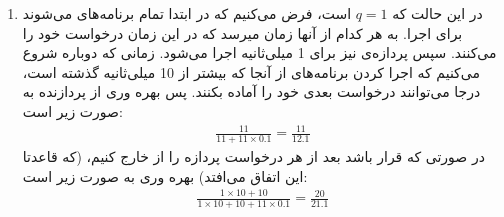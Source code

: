 \begin{enumerate}
    \item در این حالت که
    $q = 1$
    است، فرض می‌کنیم که در ابتدا تمام برنامه‌های
    می‌شوند برای اجرا. به هر کدام از آنها
    زمان میرسد که در این زمان درخواست
    خود را
    می‌کنند. سپس پردازه‌ی
    نیز برای 1 میلی‌ثانیه اجرا می‌شود. زمانی که دوباره شروع می‌کنیم که اجرا کردن برنامه‌های
    از آنجا که بیشتر از 10 میلی‌ثانیه گذشته است، درجا می‌توانند درخواست بعدی خود را آماده بکنند.
    پس بهره وری از پردازنده به صورت زیر است:
    \begin{gather*}
        \frac{11}{11 + 11 \times 0.1} = \frac{11}{12.1}
    \end{gather*}
    در صورتی که قرار باشد بعد از هر درخواست
    پردازه را از
    خارج کنیم، (که قاعدتا این اتفاق می‌افتد)
    بهره وری به صورت زیر است:
    \begin{gather*}
        \frac{1 \times 10 + 10}{1 \times 10 + 10 + 11 \times 0.1} = \frac{20}{21.1}
    \end{gather*}
\end{enumerate}